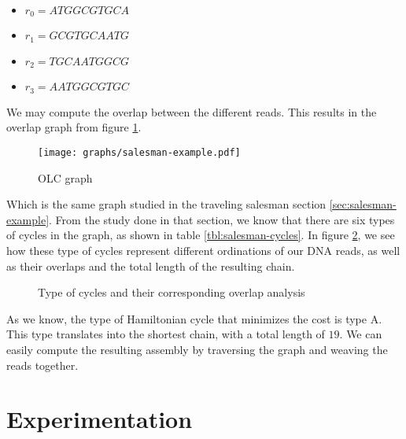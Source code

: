 \begin{itemize}
	\item $r_0 = ATGGCGTGCA$
	\item $r_1 = GCGTGCAATG$
	\item $r_2 = TGCAATGGCG$
	\item $r_3 = AATGGCGTGC$
\end{itemize}

We may compute the overlap between the different reads. This results in the overlap graph from figure \ref{fig:overlap-graph}.

\begin{figure}[h]
	\texttt{[image: graphs/salesman-example.pdf]}
	\centering
	\caption{OLC graph}
	\label{fig:overlap-graph}
\end{figure}

Which is the same graph studied in the traveling salesman section \ref{sec:salesman-example}. From the study done in that section, we know that there are six types of cycles in the graph, as shown in table \ref{tbl:salesman-cycles}. In figure \ref{fig:overlap-cycles}, we see how these type of cycles represent different ordinations of our DNA reads, as well as their overlaps and the total length of the resulting chain.

\begin{figure}[h]
	\centering
	\caption{Type of cycles and their corresponding overlap analysis \cite{Sarkar2020}}
	\label{fig:overlap-cycles}
\end{figure}

As we know, the type of Hamiltonian cycle that minimizes the cost is type A. This type translates into the shortest chain, with a total length of $19$. We can easily compute the resulting assembly by traversing the graph and weaving the reads together.


\section{Experimentation}






